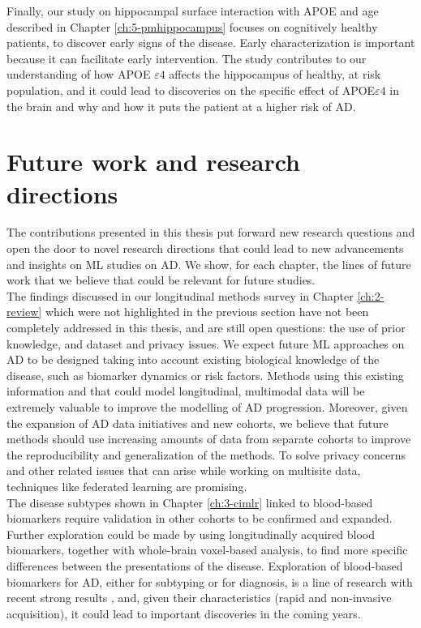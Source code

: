 Finally, our study on hippocampal surface interaction with APOE and age described in Chapter \ref{ch:5-pmhippocampus} focuses on cognitively healthy patients, to discover early signs of the disease. Early characterization is important because it can facilitate early intervention. The study contributes to our understanding of how APOE $\varepsilon4$ affects the hippocampus of healthy, at risk population, and it could lead to discoveries on the specific effect of APOE$\varepsilon4$ in the brain and why and how it puts the patient at a higher risk of AD.

\section{Future work and research directions}

The contributions presented in this thesis put forward new research questions and open the door to novel research directions that could lead to new advancements and insights on ML studies on AD. We show, for each chapter, the lines of future work that we believe that could be relevant for future studies. \\

The findings discussed in our longitudinal methods survey in Chapter \ref{ch:2-review} which were not highlighted in the previous section have not been completely addressed in this thesis, and are still open questions: the use of prior knowledge, and dataset and privacy issues. We expect future ML approaches on AD to be designed taking into account existing biological knowledge of the disease, such as biomarker dynamics or risk factors. Methods using this existing information and that could model longitudinal, multimodal data will be extremely valuable to improve the modelling of AD progression. Moreover, given the expansion of AD data initiatives and new cohorts, we believe that future methods should use increasing amounts of data from separate cohorts to improve the reproducibility and generalization of the methods. To solve privacy concerns and other related issues that can arise while working on multisite data, techniques like federated learning \cite{Yang2019} are promising. \\

The disease subtypes shown in Chapter \ref{ch:3-cimlr} linked to blood-based biomarkers require validation in other cohorts to be confirmed and expanded. Further exploration could be made by using longitudinally acquired blood biomarkers, together with whole-brain voxel-based analysis, to find more specific differences between the presentations of the disease. Exploration of blood-based biomarkers for AD, either for subtyping or for diagnosis, is a line of research with recent strong results \cite{Cullen2020,Moscoso2020}, and, given their characteristics (rapid and non-invasive acquisition), it could lead to important discoveries in the coming years. \\

